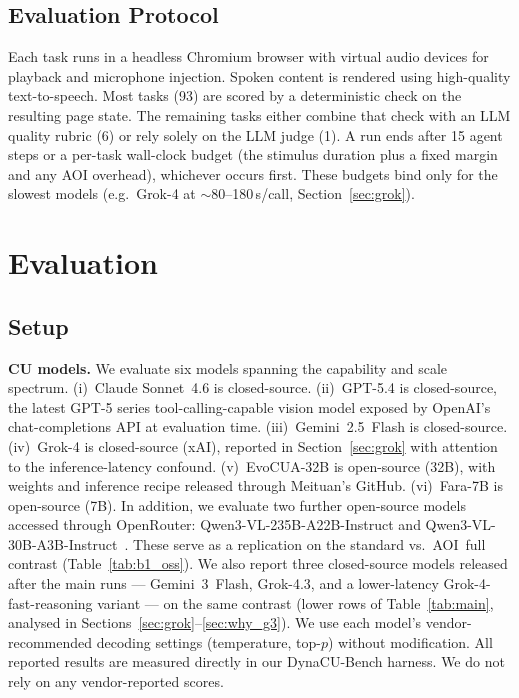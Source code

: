 \documentclass[11pt]{article}
\begin{document}
\subsection{Evaluation Protocol}

Each task runs in a headless Chromium browser with virtual audio devices for
playback and microphone injection. Spoken content is rendered using
high-quality text-to-speech.
Most tasks (93) are scored by a deterministic check on the resulting page state.
The remaining tasks either combine that check with an LLM quality rubric (6) or rely solely on the LLM judge (1).
A run ends after 15 agent steps or a per-task wall-clock budget (the stimulus
duration plus a fixed margin and any AOI overhead), whichever occurs first.
These budgets bind only for the slowest models
(e.g.\ Grok-4 at $\sim$80--180\,s/call, Section~\ref{sec:grok}).

\section{Evaluation}
\label{sec:eval}

\subsection{Setup}

\textbf{CU models.}
We evaluate six models spanning the capability and scale spectrum.
(i)~Claude Sonnet~4.6 \citep{anthropic2024claude} is closed-source.
(ii)~GPT-5.4 \citep{openai2026gpt54} is closed-source, the latest GPT-5 series tool-calling-capable vision model exposed by OpenAI's chat-completions API at evaluation time.
(iii)~Gemini~2.5~Flash \citep{gemini25cu} is closed-source.
(iv)~Grok-4 \citep{xai2026grok4} is closed-source (xAI), reported in Section~\ref{sec:grok} with attention to the inference-latency confound.
(v)~EvoCUA-32B \citep{evocua} is open-source (32B), with weights and inference recipe released through Meituan's GitHub.
(vi)~Fara-7B \citep{fara7b} is open-source (7B).
In addition, we evaluate two further open-source models accessed through OpenRouter: Qwen3-VL-235B-A22B-Instruct and Qwen3-VL-30B-A3B-Instruct~\citep{qwen3vl}. These serve as a replication on the standard vs.\ AOI~full contrast (Table~\ref{tab:b1_oss}).
We also report three closed-source models released after the main runs --- Gemini~3~Flash, Grok-4.3, and a lower-latency Grok-4-fast-reasoning variant --- on the same contrast (lower rows of Table~\ref{tab:main}, analysed in Sections~\ref{sec:grok}--\ref{sec:why_g3}).
We use each model's vendor-recommended decoding settings (temperature, top-$p$) without modification.
All reported results are measured directly in our DynaCU-Bench harness. We do not rely on any vendor-reported scores.
\end{document}
